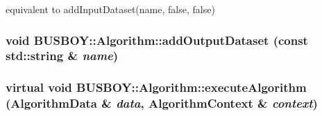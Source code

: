 equivalent to {\ttfamily addInputDataset(name, false, false)} \hypertarget{classBUSBOY_1_1Algorithm_ab71ae1c6e6931b1d161460de7488fba2}{
\subsubsection[{addOutputDataset}]{\setlength{\rightskip}{0pt plus 5cm}void BUSBOY::Algorithm::addOutputDataset (const std::string \& {\em name})}}
\label{classBUSBOY_1_1Algorithm_ab71ae1c6e6931b1d161460de7488fba2}
\hypertarget{classBUSBOY_1_1Algorithm_aff24ae92d1e8391b86d3eb9f1d3f614b}{
\subsubsection[{executeAlgorithm}]{\setlength{\rightskip}{0pt plus 5cm}virtual void BUSBOY::Algorithm::executeAlgorithm ({\bf AlgorithmData} \& {\em data}, \/  {\bf AlgorithmContext} \& {\em context})}}
\label{classBUSBOY_1_1Algorithm_aff24ae92d1e8391b86d3eb9f1d3f614b}


